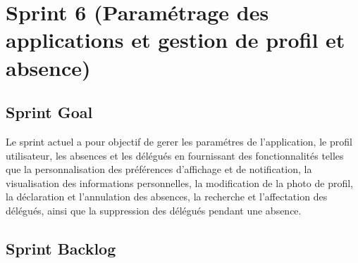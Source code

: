 \section{Sprint 6 (Paramétrage des applications et gestion de profil et absence)}

\subsection{Sprint Goal}
Le sprint actuel a pour objectif de gerer les paramétres de l'application, le profil utilisateur, les absences et les délégués en fournissant des fonctionnalités telles que la personnalisation des préférences d'affichage et de notification, la visualisation des informations personnelles, la modification de la photo de profil, la déclaration et l'annulation des absences, la recherche et l'affectation des délégués, ainsi que la suppression des délégués pendant une absence.

\subsection{Sprint Backlog}


